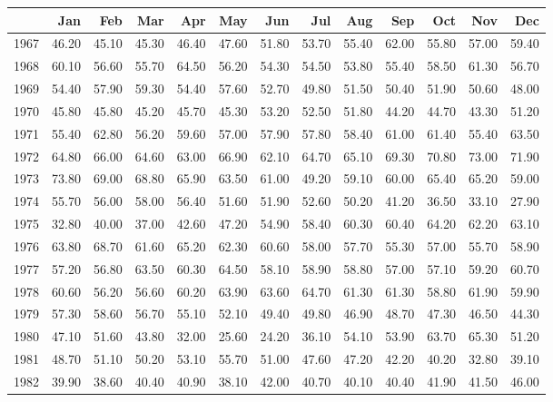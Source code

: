 \begin{longtable}{rrrrrrrrrrrrr}
  \hline
 & Jan & Feb & Mar & Apr & May & Jun & Jul & Aug & Sep & Oct & Nov & Dec \\ 
  \hline
1967 & 46.20 & 45.10 & 45.30 & 46.40 & 47.60 & 51.80 & 53.70 & 55.40 & 62.00 & 55.80 & 57.00 & 59.40 \\ 
  1968 & 60.10 & 56.60 & 55.70 & 64.50 & 56.20 & 54.30 & 54.50 & 53.80 & 55.40 & 58.50 & 61.30 & 56.70 \\ 
  1969 & 54.40 & 57.90 & 59.30 & 54.40 & 57.60 & 52.70 & 49.80 & 51.50 & 50.40 & 51.90 & 50.60 & 48.00 \\ 
  1970 & 45.80 & 45.80 & 45.20 & 45.70 & 45.30 & 53.20 & 52.50 & 51.80 & 44.20 & 44.70 & 43.30 & 51.20 \\ 
  1971 & 55.40 & 62.80 & 56.20 & 59.60 & 57.00 & 57.90 & 57.80 & 58.40 & 61.00 & 61.40 & 55.40 & 63.50 \\ 
  1972 & 64.80 & 66.00 & 64.60 & 63.00 & 66.90 & 62.10 & 64.70 & 65.10 & 69.30 & 70.80 & 73.00 & 71.90 \\ 
  1973 & 73.80 & 69.00 & 68.80 & 65.90 & 63.50 & 61.00 & 49.20 & 59.10 & 60.00 & 65.40 & 65.20 & 59.00 \\ 
  1974 & 55.70 & 56.00 & 58.00 & 56.40 & 51.60 & 51.90 & 52.60 & 50.20 & 41.20 & 36.50 & 33.10 & 27.90 \\ 
  1975 & 32.80 & 40.00 & 37.00 & 42.60 & 47.20 & 54.90 & 58.40 & 60.30 & 60.40 & 64.20 & 62.20 & 63.10 \\ 
  1976 & 63.80 & 68.70 & 61.60 & 65.20 & 62.30 & 60.60 & 58.00 & 57.70 & 55.30 & 57.00 & 55.70 & 58.90 \\ 
  1977 & 57.20 & 56.80 & 63.50 & 60.30 & 64.50 & 58.10 & 58.90 & 58.80 & 57.00 & 57.10 & 59.20 & 60.70 \\ 
  1978 & 60.60 & 56.20 & 56.60 & 60.20 & 63.90 & 63.60 & 64.70 & 61.30 & 61.30 & 58.80 & 61.90 & 59.90 \\ 
  1979 & 57.30 & 58.60 & 56.70 & 55.10 & 52.10 & 49.40 & 49.80 & 46.90 & 48.70 & 47.30 & 46.50 & 44.30 \\ 
  1980 & 47.10 & 51.60 & 43.80 & 32.00 & 25.60 & 24.20 & 36.10 & 54.10 & 53.90 & 63.70 & 65.30 & 51.20 \\ 
  1981 & 48.70 & 51.10 & 50.20 & 53.10 & 55.70 & 51.00 & 47.60 & 47.20 & 42.20 & 40.20 & 32.80 & 39.10 \\ 
  1982 & 39.90 & 38.60 & 40.40 & 40.90 & 38.10 & 42.00 & 40.70 & 40.10 & 40.40 & 41.90 & 41.50 & 46.00 \\ 

\end{longtable}
